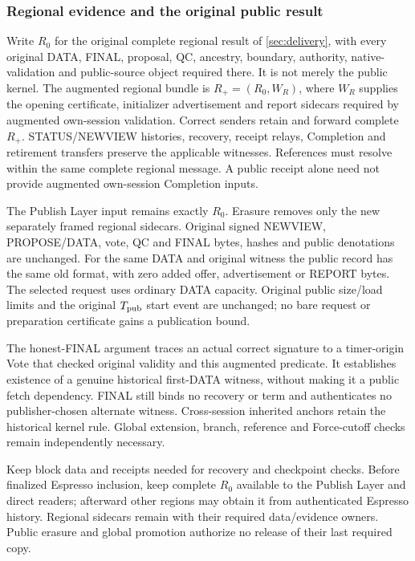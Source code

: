 \subsubsection{Regional evidence and the original public result}
\label{sec:input-report-carriage}
Write $R_0$ for the original complete regional result of
\cref{sec:delivery}, with every original DATA, FINAL, proposal, QC,
ancestry, boundary, authority, native-validation and public-source object
required there. It is not merely the public kernel. The augmented regional
bundle is $R_+=(R_0,W_R)$, where $W_R$ supplies the opening certificate,
initializer advertisement and report sidecars required by augmented
own-session validation. Correct senders retain and forward complete
$R_+$. STATUS/NEWVIEW histories, recovery, receipt relays, Completion and
retirement transfers preserve the applicable witnesses. References must
resolve within the same complete regional message. A public receipt
alone need not provide augmented own-session Completion inputs.

The Publish Layer input remains exactly $R_0$. Erasure removes only the
new separately framed regional sidecars. Original signed NEWVIEW,
PROPOSE/DATA, vote, QC and FINAL bytes, hashes and public denotations
are unchanged. For the same DATA and original witness the public record
has the same old format, with zero added offer, advertisement or REPORT
bytes. The selected request uses ordinary DATA capacity. Original public
size/load limits and the original $T_{\rm pub}$ start event are unchanged;
no bare request or preparation certificate gains a publication bound.

The honest-FINAL argument traces an actual correct signature to a
timer-origin Vote that checked original validity and this augmented
predicate. It establishes existence of a genuine historical first-DATA
witness, without making it a public fetch dependency. FINAL still binds
no recovery or term and authenticates no publisher-chosen alternate
witness. Cross-session inherited anchors retain the historical kernel
rule. Global extension, branch, reference and Force-cutoff checks remain
independently necessary.

Keep block data and receipts needed for recovery and checkpoint checks.
Before finalized Espresso inclusion, keep complete $R_0$ available to
the Publish Layer and direct readers; afterward other regions may obtain
it from authenticated Espresso history. Regional sidecars remain with
their required data/evidence owners. Public erasure and global promotion
authorize no release of their last required copy.

